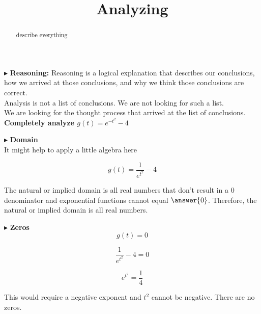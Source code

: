 \documentclass{ximera}
\title{Analyzing}
\begin{document}
\begin{abstract}
describe everything
\end{abstract}
\maketitle









$\blacktriangleright$ \textbf{\textcolor{red!80!black}{Reasoning:}} Reasoning is a logical explanation that describes our conclusions, how we arrived at those conclusions, and why we think those conclusions are correct. \\

Analysis is not a list of conclusions. We are not looking for such a list. \\

We are looking for the thought process that arrived at the list of conclusions. \\








\textbf{\textcolor{purple!85!blue}{Completely analyze $g(t) = e^{-t^2} - 4$}}

$\blacktriangleright$  \textbf{\textcolor{blue!55!black}{Domain}} \\


It might help to apply a little algebra here


\[
g(t) = \frac{1}{e^{t^2}} - 4
\]


The natural or implied domain is all real numbers that don't result in a $0$ denominator and exponential functions cannot equal $\answer{0}$.  Therefore, the natural or implied domain is all real numbers.







$\blacktriangleright$  \textbf{\textcolor{blue!55!black}{Zeros}} \\

\[
g(t) = 0
\]



\[
\frac{1}{e^{t^2}} - 4 = 0
\]


\[
e^{t^2} = \frac{1}{4}
\]


This would require a negative exponent and $t^2$ cannot be negative.  There are no zeros.
\end{document}

